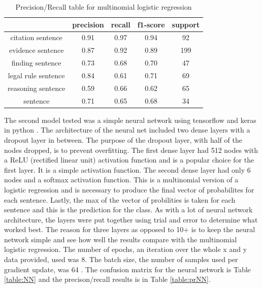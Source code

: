 \documentclass[11pt]{article}
\begin{document}
\vspace{1.4em}
\begin{table}
  \centering
  \begin{tabular}{| c | c | c | c | c |}
    \hline
    &                   precision  &   recall &  f1-score  &  support \\
    \hline
    citation sentence &       0.91 &     0.97 &     0.94 &       92 \\
    evidence sentence &       0.87 &     0.92 &     0.89 &      199 \\
    finding sentence &       0.73 &     0.68 &     0.70 &       47 \\
    legal rule sentence &       0.84 &     0.61 &     0.71 &       69 \\
    reasoning sentence &       0.59 &     0.66 &     0.62 &       65 \\
    sentence &       0.71 &     0.65 &     0.68 &       34 \\
    \hline
  \end{tabular}
  \caption{Precision/Recall table for multinomial logistic regression}
  \label{table:prLR}
\end{table}
\vspace{0.3em}


The second model tested was a simple neural network using tensorflow and keras in python \cite{tensorflow2015-whitepaper}. The architecture of the neural net included two dense layers with a dropout layer in between. The purpose of the dropout layer, with half of the nodes dropped, is to prevent overfitting. The first dense layer had 512 nodes with a ReLU (rectified linear unit) activation function and is a popular choice for the first layer. It is a simple activation function. The second dense layer had only 6 nodes and a softmax activation function. This is a multinomial version of a logistic regression and is necessary to produce the final vector of probabilites for each sentence. Lastly, the max of the vector of probilities is taken for each sentence and this is the prediction for the class. As with a lot of neural network architecture, the layers were put together using trial and error to determine what worked best. The reason for three layers as opposed to 10+ is to keep the neural network simple and see how well the results compare with the multinomial logistic regression. The number of epochs, an iteration over the whole x and y data provided, used was 8. The batch size, the number of samples used per gradient update, was 64 \cite{tensorflow2015-whitepaper}. The confusion matrix for the neural network is Table \ref{table:NN} and the precison/recall results is in Table \ref{table:prNN}.
\end{document}
